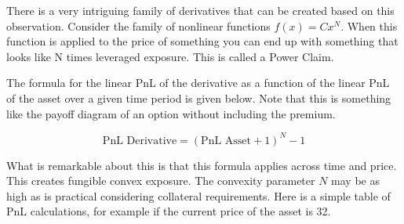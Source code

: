 \documentclass[12pt]{article}
\begin{document}
    There is a very intriguing family of derivatives that can be created based on this observation. Consider the family of nonlinear functions $f(x) = C x^N$. When this function is applied to the price of something you can end up with something that looks like N times leveraged exposure. This is called a Power Claim.

    The formula for the linear PnL of the derivative as a function of the linear PnL of the asset over a given time period is given below. Note that this is something like the payoff diagram of an option without including the premium.

    \begin{equation*}
        \text{PnL Derivative} = (\text{PnL Asset} + 1)^N - 1
    \end{equation*}

    What is remarkable about this is that this formula applies across time and price. This creates fungible convex exposure. The convexity parameter $N$ may be as high as is practical considering collateral requirements. Here is a simple table of PnL calculations, for example if the current price of the asset is 32.
\end{document}
